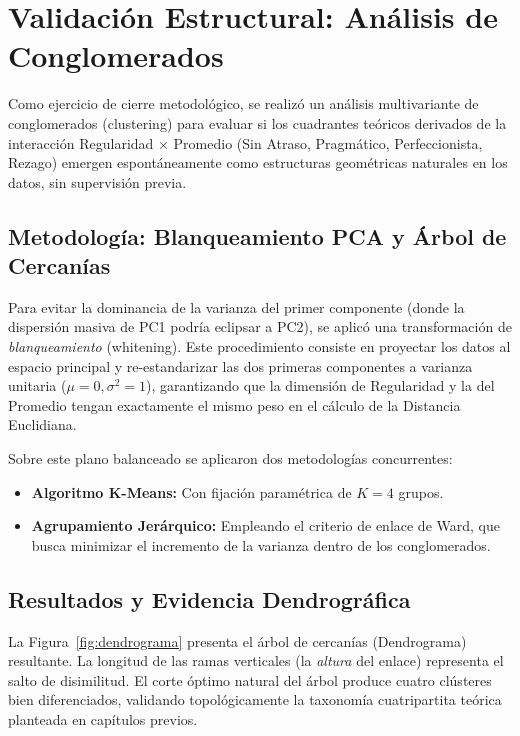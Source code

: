 \section{Validación Estructural: Análisis de Conglomerados}
\label{sec:validacion_conglomerados}

Como ejercicio de cierre metodológico, se realizó un análisis multivariante de conglomerados
(clustering) para evaluar si los cuadrantes teóricos derivados de la interacción
Regularidad $\times$ Promedio (Sin Atraso, Pragmático, Perfeccionista, Rezago) emergen
espontáneamente como estructuras geométricas naturales en los datos, sin supervisión previa.

\subsection{Metodología: Blanqueamiento PCA y Árbol de Cercanías}

Para evitar la dominancia de la varianza del primer componente (donde la dispersión masiva de
PC1 podría eclipsar a PC2), se aplicó una transformación de \emph{blanqueamiento} (whitening). 
Este procedimiento consiste en proyectar los datos al espacio principal y re-estandarizar las
dos primeras componentes a varianza unitaria ($\mu = 0, \sigma^2 = 1$), garantizando que la 
dimensión de Regularidad y la del Promedio tengan exactamente el mismo peso en el cálculo de
la Distancia Euclidiana.

Sobre este plano balanceado se aplicaron dos metodologías concurrentes:
\begin{itemize}
    \item \textbf{Algoritmo K-Means:} Con fijación paramétrica de $K=4$ grupos.
    \item \textbf{Agrupamiento Jerárquico:} Empleando el criterio de enlace de Ward, que busca
          minimizar el incremento de la varianza dentro de los conglomerados.
\end{itemize}

\subsection{Resultados y Evidencia Dendrográfica}

La Figura~\ref{fig:dendrograma} presenta el árbol de cercanías (Dendrograma) resultante. La longitud
de las ramas verticales (la \emph{altura} del enlace) representa el salto de disimilitud. El corte
óptimo natural del árbol produce cuatro clústeres bien diferenciados, validando topológicamente la
taxonomía cuatripartita teórica planteada en capítulos previos.

